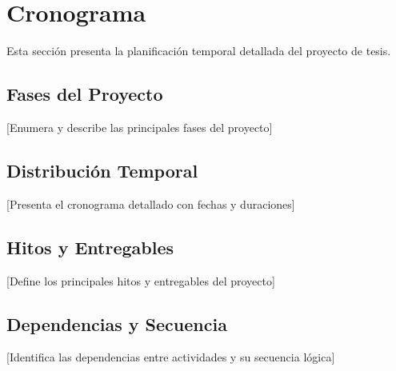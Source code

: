 \section{Cronograma}

Esta sección presenta la planificación temporal detallada del proyecto de tesis.

\subsection{Fases del Proyecto}
[Enumera y describe las principales fases del proyecto]

\subsection{Distribución Temporal}
[Presenta el cronograma detallado con fechas y duraciones]

\subsection{Hitos y Entregables}
[Define los principales hitos y entregables del proyecto]

\subsection{Dependencias y Secuencia}
[Identifica las dependencias entre actividades y su secuencia lógica]